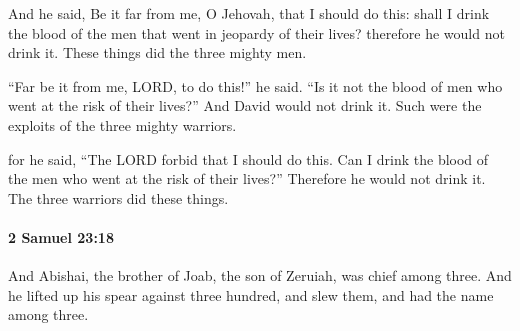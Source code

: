 			\begin{versebox}
					\item[BHS] 
					\item[ASV] And he said, Be it far from me, O Jehovah, that I should do this: shall I drink the blood of the men that went in jeopardy of their lives? therefore he would not drink it. These things did the three mighty men.
					\item[NIV] “Far be it from me, LORD, to do this!” he said. “Is it not the blood of men who went at the risk of their lives?” And David would not drink it. Such were the exploits of the three mighty warriors.
					\item[NRSV] for he said, “The LORD forbid that I should do this. Can I drink the blood of the men who went at the risk of their lives?” Therefore he would not drink it. The three warriors did these things.
			\end{versebox}

		\paragraph{2 Samuel 23:18} %
			\label{2SAMUEL-23-18}

			And Abishai, the brother of Joab, the son of Zeruiah, was chief among three. And he lifted up his spear against three hundred, and slew them, and had the name among three.

